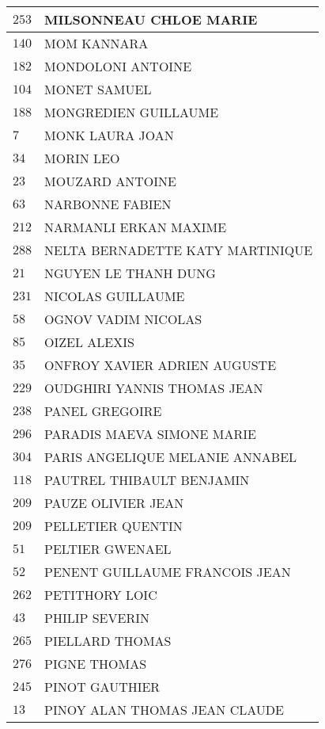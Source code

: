 \begin{xltabular}{\linewidth}{|l|X|}
    \hline
    $253$ & MILSONNEAU CHLOE MARIE \\
    \hline
    $140$ & MOM KANNARA \\
    \hline
    $182$ & MONDOLONI ANTOINE \\
    \hline
    $104$ & MONET SAMUEL \\
    \hline
    $188$ & MONGREDIEN GUILLAUME \\
    \hline
    $7$ & MONK LAURA JOAN \\
    \hline
    $34$ & MORIN LEO \\
    \hline
    $23$ & MOUZARD ANTOINE \\
    \hline
    $63$ & NARBONNE FABIEN \\
    \hline
    $212$ & NARMANLI ERKAN MAXIME \\
    \hline
    $288$ & NELTA BERNADETTE KATY MARTINIQUE \\
    \hline
    $21$ & NGUYEN LE THANH DUNG \\
    \hline
    $231$ & NICOLAS GUILLAUME \\
    \hline
    $58$ & OGNOV VADIM NICOLAS \\
    \hline
    $85$ & OIZEL ALEXIS \\
    \hline
    $35$ & ONFROY XAVIER ADRIEN AUGUSTE \\
    \hline
    $229$ & OUDGHIRI YANNIS THOMAS JEAN \\
    \hline
    $238$ & PANEL GREGOIRE \\
    \hline
    $296$ & PARADIS MAEVA SIMONE MARIE \\
    \hline
    $304$ & PARIS ANGELIQUE MELANIE ANNABEL \\
    \hline
    $118$ & PAUTREL THIBAULT BENJAMIN \\
    \hline
    $209$ & PAUZE OLIVIER JEAN \\
    \hline
    $209$ & PELLETIER QUENTIN \\
    \hline
    $51$ & PELTIER GWENAEL \\
    \hline
    $52$ & PENENT GUILLAUME FRANCOIS JEAN \\
    \hline
    $262$ & PETITHORY LOIC \\
    \hline
    $43$ & PHILIP SEVERIN \\
    \hline
    $265$ & PIELLARD THOMAS \\
    \hline
    $276$ & PIGNE THOMAS \\
    \hline
    $245$ & PINOT GAUTHIER \\
    \hline
    $13$ & PINOY ALAN THOMAS JEAN CLAUDE \\

\end{xltabular}
